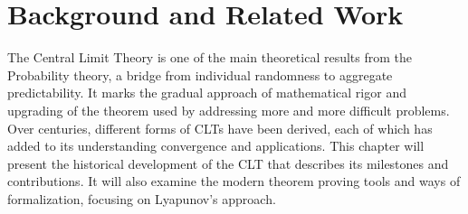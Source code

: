 
\chapter[Background and Related Work]{Background and Related Work}
\label{chap:2}





The Central Limit Theory is one of the main theoretical results from the  Probability theory, a bridge from individual randomness to aggregate predictability. It marks the gradual approach of mathematical rigor and upgrading of the theorem used by addressing more and more difficult problems. Over centuries, different forms of CLTs have been derived, each of which has added to its understanding convergence and applications. This chapter will present the historical development of the CLT that describes its milestones and contributions. It will also examine the modern theorem proving tools and ways of formalization, focusing on Lyapunov's approach.

